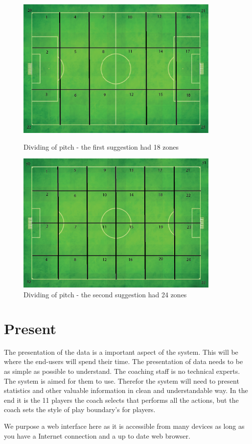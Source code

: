 \begin{figure}[ht!]
\centering
\includegraphics[width=100mm]{images/general/first_zones.png}
\caption{Dividing of pitch - the first suggestion had 18 zones}
\includegraphics[width=100mm]{images/general/second_zones.png}
\caption{Dividing of pitch - the second suggestion had 24 zones}
\label{overflow}
\end{figure}

\section{Present}

The presentation of the data is a important aspect of the system. This will be where the end-users will spend their time. The presentation of data needs to be as simple as possible to understand. The coaching staff is no technical experts. The system is  aimed for them to use. Therefor the system will need to present statistics and other valuable information in clean and understandable way. In the end it is the 11 players the coach selects that performs all the actions, but the coach sets the style of play boundary's for players. 

We purpose a web interface here as it is accessible from many devices as long as you have a Internet connection and a up to date web browser. 

\sect